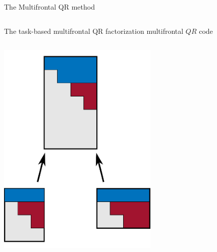 \begin{frame}{The Multifrontal QR method}
\begin{columns}
\begin{column}{0.4\textwidth}
\begin{center}
      \end{center}
    \end{column}
  \end{columns}
\end{frame}

\begin{frame}[fragile,t]{The task-based multifrontal QR factorization}
   multifrontal $QR$ code

  \begin{columns}[t]
    \begin{column}{0.45\textwidth}
      \begin{center}
        \includegraphics[width=0.6\textwidth]{figures/tree}
      \end{center}
    \end{column}
    \begin{column}{0.55\textwidth}
      
    \end{column}
  \end{columns}
\end{frame}

